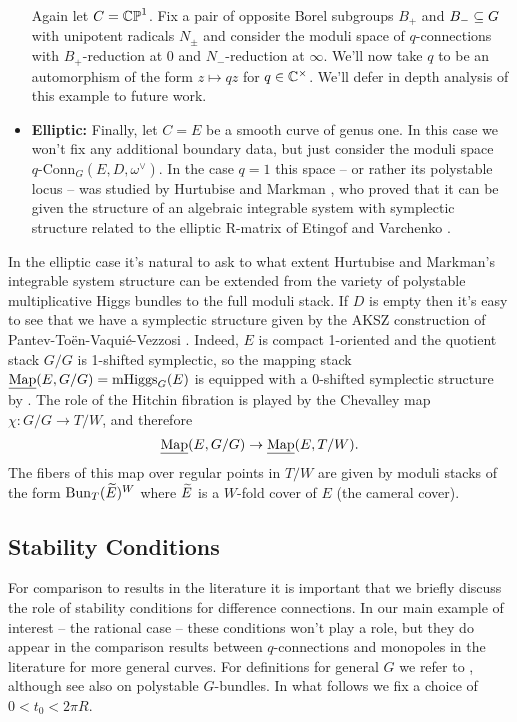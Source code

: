 \documentclass[10pt, oneside]{article}
\DeclareMathOperator{\mhiggs}{mHiggs}
\newcommand{\map}{\ul{\mr{Map}}}
\newcommand{\qconn}{q\text{-Conn}}
\begin{document}
\begin{examples}
\begin{itemize}
  Again let $C = \mathbb{CP}^1$.  Fix a pair of opposite Borel subgroups $B_+$ and $B_- \subseteq G$ with unipotent radicals $N_\pm$ and consider the moduli space of $q$-connections with $B_+$-reduction at $0$ and $N_-$-reduction at $\infty$.  We'll now take $q$ to be an automorphism of the form $z \mapsto qz$ for $q \in \mathbb{C}^\times$.  We'll defer in depth analysis of this example to future work.
  \item \textbf{Elliptic:} Finally, let $C = E$ be a smooth curve of genus one.  In this case we won't fix any additional boundary data, but just consider the moduli space $\qconn_G(E,D, \omega^\vee)$.  In the case $q = 1$ this space -- or rather its polystable locus -- was studied by Hurtubise and Markman \cite{HurtubiseMarkman}, who proved that it can be given the structure of an algebraic integrable system with symplectic structure related to the elliptic R-matrix of Etingof and Varchenko \cite{EtingofVarchenko}.
 \end{itemize}
\end{examples}

\begin{remark}
In the elliptic case it's natural to ask to what extent Hurtubise and Markman's integrable system structure can be extended from the variety of polystable multiplicative Higgs bundles to the full moduli stack.  If $D$ is empty then it's easy to see that we have a symplectic structure given by the AKSZ construction of Pantev-To\"en-Vaqui\'e-Vezzosi \cite{PTVV}.  Indeed, $E$ is compact 1-oriented and the quotient stack $G/G$ is 1-shifted symplectic, so the mapping stack $\map(E, G/G) = \mhiggs_G(E)$ is equipped with a 0-shifted symplectic structure by \cite[Theorem 2.5]{PTVV}.  The role of the Hitchin fibration is played by the Chevalley map $\chi \colon G/G \to T/W$, and therefore
\[\map(E,G/G) \to \map(E,T/W).\]
The fibers of this map over regular points in $T/W$ are given by moduli stacks of the form $\operatorname{Bun}_T(\widetilde{E})^W$ where $\widetilde{E}$ is a $W$-fold cover of $E$ (the cameral cover). 
\end{remark}

\subsection{Stability Conditions}
For comparison to results in the literature it is important that we briefly discuss the role of stability conditions for difference connections.  In our main example of interest -- the rational case -- these conditions won't play a role, but they do appear in the comparison results between $q$-connections and monopoles in the literature for more general curves.  For definitions for general $G$ we refer to \cite{Smith}, although see also \cite{AnchoucheBiswas} on polystable $G$-bundles.  In what follows we fix a choice of $0 < t_0 < 2\pi R$.
\end{document}
